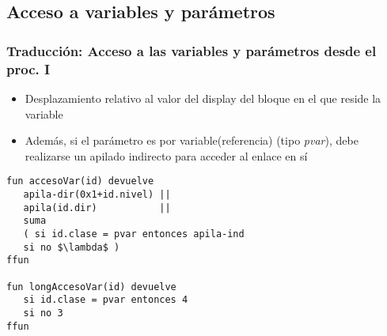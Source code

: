 \documentclass[hyperref={pdfpagelabels=false},tree-dvips,compress]{beamer}
\begin{document}
\subsection{Acceso a variables y parámetros}
\begin{frame}[fragile]
\frametitle{Traducción: Acceso a las variables y parámetros desde el proc. I}

\begin{itemize}
	\item Desplazamiento relativo al valor del display del bloque en el que reside la variable
	\item Además, si el parámetro es por variable(referencia) (tipo \emph{pvar}), debe realizarse un apilado indirecto para acceder al enlace en sí
\end{itemize}

\begin{lstlisting}[style=codigoMP,basicstyle=\tiny\ttfamily,mathescape]
fun accesoVar(id) devuelve
   apila-dir(0x1+id.nivel) ||
   apila(id.dir)           ||
   suma
   ( si id.clase = pvar entonces apila-ind
   si no $\lambda$ )
ffun

fun longAccesoVar(id) devuelve
   si id.clase = pvar entonces 4
   si no 3
ffun
\end{lstlisting}

\end{frame}
\end{document}
